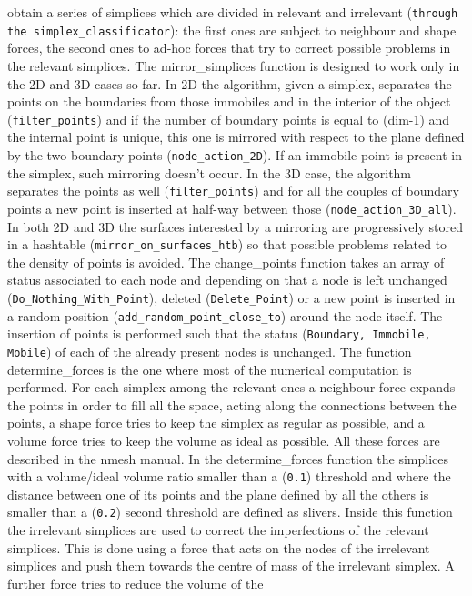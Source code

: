 \documentclass[12pt,twoside]{article}
\newcommand{\om}[1]{(\texttt{#1})}
\begin{document}
obtain a series of simplices which are divided in relevant and
irrelevant \om{through the simplex\_classificator}: the first ones are
subject to neighbour and shape forces, the second ones to ad-hoc
forces that try to correct possible problems in the relevant
simplices. The mirror\_simplices function is designed 
to work only in the 2D and 3D cases so far. In 2D the algorithm, given a
simplex, separates the points on the boundaries from those immobiles
and in the interior of the object \om{filter\_points} and if the number
of boundary points is equal to (dim-1) and the internal point is
unique, this one is mirrored with respect to the plane defined by the
two boundary points \om{node\_action\_2D}. If an immobile point is
present in the simplex, such mirroring doesn't occur. In the 3D case,
the algorithm separates the points as well \om{filter\_points} and for
all the couples of boundary points a new point is inserted at half-way
between those \om{node\_action\_3D\_all}. In both 2D and 3D the surfaces
interested by a mirroring are progressively stored in a hashtable
\om{mirror\_on\_surfaces\_htb} so that possible problems related to the
density of points is avoided. The change\_points function takes an
array of status associated to each node and depending on that 
a node is left unchanged \om{Do\_Nothing\_With\_Point}, deleted
\om{Delete\_Point} or a new point is inserted in a random position
\om{add\_random\_point\_close\_to} around the node itself. The insertion
of points is performed such that the status \om{Boundary, Immobile,
  Mobile} of each of the already present nodes is unchanged. 
The function determine\_forces is the one where most of the numerical
computation is performed. For each simplex among the relevant ones a
neighbour force expands the points in order to fill all the space,
acting along the connections between the points, a shape force tries
to keep the simplex as regular as possible, and a volume force tries
to keep the volume as ideal as possible. All these forces are
described in the nmesh manual. In the determine\_forces function the
simplices with a volume/ideal volume ratio smaller than a \om{0.1}
threshold and where the distance between one of its points and the
plane defined by all the others is smaller than a \om{0.2} second
threshold are defined as slivers. Inside this function the irrelevant
simplices are used to correct the imperfections of the relevant
simplices. This is done using a force that acts on the nodes of the
irrelevant simplices and push them towards the centre of mass of the
irrelevant simplex. A further force tries to reduce the volume of the
\end{document}
